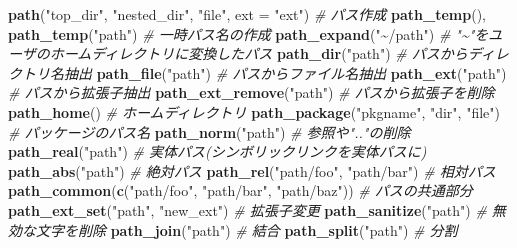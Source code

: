 \documentclass[
]{article}
\newenvironment{Shaded}{\begin{snugshade}}{\end{snugshade}}
\newcommand{\AttributeTok}[1]{\textcolor[rgb]{0.13,0.29,0.53}{#1}}
\newcommand{\CommentTok}[1]{\textcolor[rgb]{0.56,0.35,0.01}{\textit{#1}}}
\newcommand{\FunctionTok}[1]{\textcolor[rgb]{0.13,0.29,0.53}{\textbf{#1}}}
\newcommand{\NormalTok}[1]{#1}
\newcommand{\StringTok}[1]{\textcolor[rgb]{0.31,0.60,0.02}{#1}}
\begin{document}
\begin{Shaded}
\begin{Highlighting}[]
\FunctionTok{path}\NormalTok{(}\StringTok{"top\_dir"}\NormalTok{, }\StringTok{"nested\_dir"}\NormalTok{, }\StringTok{"file"}\NormalTok{, }\AttributeTok{ext =} \StringTok{"ext"}\NormalTok{)  }\CommentTok{\# パス作成   }
\FunctionTok{path\_temp}\NormalTok{(), }\FunctionTok{path\_temp}\NormalTok{(}\StringTok{"path"}\NormalTok{)                      }\CommentTok{\# 一時パス名の作成   }
\FunctionTok{path\_expand}\NormalTok{(}\StringTok{"\textasciitilde{}/path"}\NormalTok{)                               }\CommentTok{\# "\textasciitilde{}"をユーザのホームディレクトリに変換したパス   }
\FunctionTok{path\_dir}\NormalTok{(}\StringTok{"path"}\NormalTok{)                                    }\CommentTok{\# パスからディレクトリ名抽出   }
\FunctionTok{path\_file}\NormalTok{(}\StringTok{"path"}\NormalTok{)                                   }\CommentTok{\# パスからファイル名抽出   }
\FunctionTok{path\_ext}\NormalTok{(}\StringTok{"path"}\NormalTok{)                                    }\CommentTok{\# パスから拡張子抽出   }
\FunctionTok{path\_ext\_remove}\NormalTok{(}\StringTok{"path"}\NormalTok{)                             }\CommentTok{\# パスから拡張子を削除   }
\FunctionTok{path\_home}\NormalTok{()                                         }\CommentTok{\# ホームディレクトリ   }
\FunctionTok{path\_package}\NormalTok{(}\StringTok{"pkgname"}\NormalTok{, }\StringTok{"dir"}\NormalTok{, }\StringTok{"file"}\NormalTok{)              }\CommentTok{\# パッケージのパス名   }
\FunctionTok{path\_norm}\NormalTok{(}\StringTok{"path"}\NormalTok{)                                   }\CommentTok{\# 参照や".."の削除   }
\FunctionTok{path\_real}\NormalTok{(}\StringTok{"path"}\NormalTok{)                                   }\CommentTok{\# 実体パス(シンボリックリンクを実体パスに)   }
\FunctionTok{path\_abs}\NormalTok{(}\StringTok{"path"}\NormalTok{)                                    }\CommentTok{\# 絶対パス}
\FunctionTok{path\_rel}\NormalTok{(}\StringTok{"path/foo"}\NormalTok{, }\StringTok{"path/bar"}\NormalTok{)                    }\CommentTok{\# 相対パス}
\FunctionTok{path\_common}\NormalTok{(}\FunctionTok{c}\NormalTok{(}\StringTok{"path/foo"}\NormalTok{, }\StringTok{"path/bar"}\NormalTok{, }\StringTok{"path/baz"}\NormalTok{))  }\CommentTok{\# パスの共通部分   }
\FunctionTok{path\_ext\_set}\NormalTok{(}\StringTok{"path"}\NormalTok{, }\StringTok{"new\_ext"}\NormalTok{)                     }\CommentTok{\# 拡張子変更   }
\FunctionTok{path\_sanitize}\NormalTok{(}\StringTok{"path"}\NormalTok{)                               }\CommentTok{\# 無効な文字を削除   }
\FunctionTok{path\_join}\NormalTok{(}\StringTok{"path"}\NormalTok{)                                   }\CommentTok{\# 結合}
\FunctionTok{path\_split}\NormalTok{(}\StringTok{"path"}\NormalTok{)                                  }\CommentTok{\# 分割}
\end{Highlighting}
\end{Shaded}
\end{document}
